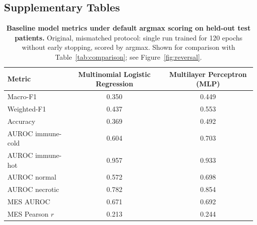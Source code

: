 \documentclass[11pt,letterpaper]{article}
\begin{document}
\clearpage
\subsection*{Supplementary Tables}

\begin{table}[H]
\centering
\caption{\textbf{Baseline model metrics under default argmax scoring on held-out test patients.} Original, mismatched protocol: single run trained for 120 epochs without early stopping, scored by argmax. Shown for comparison with Table~\ref{tab:comparison}; see Figure~\ref{fig:reversal}.}
\label{tab:s1}
\small
\begin{tabular}{lcc}
\toprule
\textbf{Metric} & \textbf{Multinomial Logistic Regression} & \textbf{Multilayer Perceptron (MLP)} \\
\midrule
Macro-F1          & 0.350 & 0.449 \\
Weighted-F1       & 0.437 & 0.553 \\
Accuracy          & 0.369 & 0.492 \\
AUROC immune-cold & 0.604 & 0.703 \\
AUROC immune-hot  & 0.957 & 0.933 \\
AUROC normal      & 0.572 & 0.698 \\
AUROC necrotic    & 0.782 & 0.854 \\
MES AUROC         & 0.671 & 0.692 \\
MES Pearson $r$   & 0.213 & 0.244 \\
\bottomrule
\end{tabular}
\end{table}

\vspace{1em}
\end{document}
